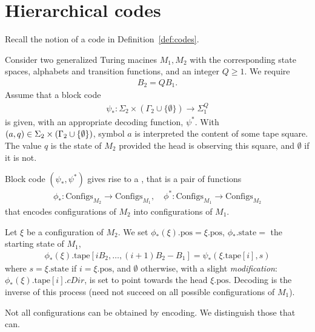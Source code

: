 \documentclass[12pt]{memoir}
\newcommand{\fld}[1]{\ensuremath{\textit{#1}}}
\def\B{B}
\newcommand{\Configs}{\mathrm{Configs}}
\newcommand{\pos}{\mathrm{pos}}
\newcommand{\cDir}{\fld{cDir}}
\newcommand{\state}{\mathrm{state}}
\newcommand{\tape}{\mathrm{tape}}
\begin{document}
\section{Hierarchical codes}\label{sec:hier-codes}

Recall the notion of a code in Definition~\ref{def:codes}.

\begin{definition}\label{def:configuration-code}
Consider two generalized Turing macines \( M_{1},M_{2} \) with the corresponding
state spaces, alphabets and transition functions, and an integer \( Q\ge 1 \).
We require
\begin{align}\label{eq:B_2-B_1-Q}
  \B_{2} = Q \B_{1}.
\end{align}
Assume that a block code
\begin{align*}
   \psi_{*}:\Sigma_{2}\times(\Gamma_{2}\cup\{\emptyset\})\to\Sigma_{1}^{Q}
 \end{align*}
is given, with an appropriate decoding function, \( \psi^{*} \).
With \( (a,q)\in\Sigma_{2}\times(\Gamma_{2}\cup\{\emptyset\}) \),
symbol \( a \) is interpreted the content of some tape square.
The value \( q \) is the state of \( M_{2} \) provided the head is observing this square,
and \( \emptyset \) if it is not.

Block code \( (\psi_{*},\psi^{*}) \) gives rise to a 
, that is a pair of functions
    \begin{align*}
        \phi_{*} :\Configs_{M_2} \to \Configs_{M_1},
        \quad
        \phi^{*}:\Configs_{M_1} \to \Configs_{M_2}
    \end{align*}
    that encodes configurations of \( M_2 \) into configurations of \( M_{1} \).

Let \( \xi \) be a configuration of \( M_2 \).
We set \( \phi_*(\xi).\pos = \xi.\pos \), \(\phi_{*}.\state=  \) 
the starting state of \( M_{1} \),
\begin{align*}
 \phi_*(\xi).\tape[i\B_2, \dots, (i+1)\B_2 - \B_1] = \psi_*(\xi.\tape[i], s)
 \end{align*}
where \( s=\xi.\state \) if \( i = \xi.\pos \), and \( \emptyset \) otherwise, with
a slight \emph{modification}: 
\( \phi_*(\xi).\tape[i].\cDir \), is set to point towards the head \( \xi.\pos \).
Decoding is the inverse of this process (need not succeed on all possible configurations
of \( M_{1} \)).
 \end{definition}

 Not all configurations can be obtained by encoding.
 We distinguish those that can.
\end{document}
